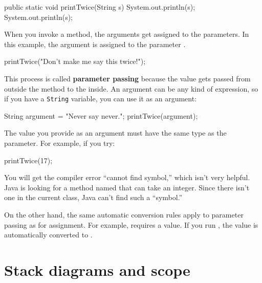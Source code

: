 \begin{code}
    public static void printTwice(String s) {
        System.out.println(s);
        System.out.println(s);
    }
\end{code}

When you invoke a method, the arguments get assigned to the parameters.
In this example, the argument  is assigned to the parameter .

\begin{code}
    printTwice("Don't make me say this twice!");
\end{code}


This process is called {\bf parameter passing} because the value gets passed from outside the method to the inside.
An argument can be any kind of expression, so if you have a {\tt String} variable, you can use it as an argument:

\begin{code}
    String argument = "Never say never.";
    printTwice(argument);
\end{code}

The value you provide as an argument must have the same type as the parameter.
For example, if you try:

\begin{code}
    printTwice(17);
\end{code}

You will get the compiler error ``cannot find symbol,'' which isn't very helpful.
Java is looking for a method named  that can take an integer.
Since there isn't one in the current class, Java can't find such a ``symbol.''

On the other hand, the same automatic conversion rules apply to parameter passing as for assignment.
For example,  requires a  value.
If you run , the value  is automatically converted to .



\section{Stack diagrams and scope}
\label{stack}


